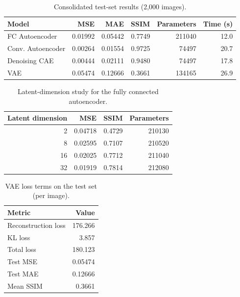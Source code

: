 \begin{table}[htbp]
\centering
\caption{Consolidated test-set results (2{,}000 images).}
\label{tab:consolidated}
\begin{tabular}{lrrrrr}
\toprule
Model & MSE & MAE & SSIM & Parameters & Time (s) \\
\midrule
FC Autoencoder & 0.01992 & 0.05442 & 0.7749 & 211040 & 12.0 \\
Conv. Autoencoder & 0.00264 & 0.01554 & 0.9725 & 74497 & 20.7 \\
Denoising CAE & 0.00444 & 0.02111 & 0.9480 & 74497 & 17.8 \\
VAE & 0.05474 & 0.12666 & 0.3661 & 134165 & 26.9 \\
\bottomrule
\end{tabular}
\end{table}

\begin{table}[htbp]
\centering
\caption{Latent-dimension study for the fully connected autoencoder.}
\label{tab:dz}
\begin{tabular}{rrrr}
\toprule
Latent dimension & MSE & SSIM & Parameters \\
\midrule
2 & 0.04718 & 0.4729 & 210130 \\
8 & 0.02595 & 0.7107 & 210520 \\
16 & 0.02025 & 0.7712 & 211040 \\
32 & 0.01919 & 0.7814 & 212080 \\
\bottomrule
\end{tabular}
\end{table}

\begin{table}[htbp]
\centering
\caption{VAE loss terms on the test set (per image).}
\label{tab:vae}
\begin{tabular}{lr}
\toprule
Metric & Value \\
\midrule
Reconstruction loss & 176.266 \\
KL loss & 3.857 \\
Total loss & 180.123 \\
Test MSE & 0.05474 \\
Test MAE & 0.12666 \\
Mean SSIM & 0.3661 \\
\bottomrule
\end{tabular}
\end{table}